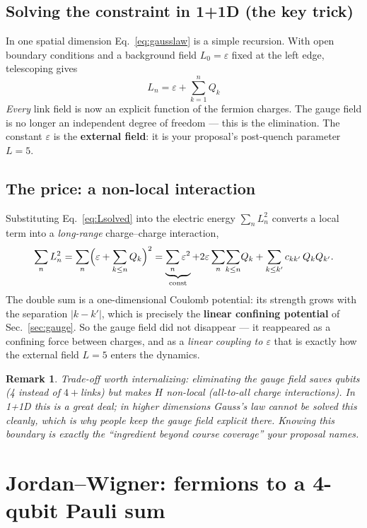 \documentclass[11pt,a4paper]{article}
\newtheorem{remark}{Remark}[section]
\begin{document}
\subsection{Solving the constraint in 1+1D (the key trick)}
In one spatial dimension Eq.~\eqref{eq:gausslaw} is a simple recursion. With open boundary
conditions and a background field $L_0=\varepsilon$ fixed at the left edge, telescoping gives
\begin{equation}
\boxed{\; L_n = \varepsilon + \sum_{k=1}^{n} Q_k \;}
\label{eq:Lsolved}
\end{equation}
\emph{Every} link field is now an explicit function of the fermion charges. The gauge field is no
longer an independent degree of freedom --- this is the elimination. The constant $\varepsilon$ is
the \textbf{external field}: it is your proposal's post-quench parameter $L=5$.

\subsection{The price: a non-local interaction}
Substituting Eq.~\eqref{eq:Lsolved} into the electric energy $\sum_n L_n^2$ converts a local term
into a \emph{long-range} charge--charge interaction,
\begin{equation}
\sum_n L_n^2 = \sum_n\Bigl(\varepsilon + \sum_{k\le n} Q_k\Bigr)^2
= \underbrace{\sum_n\varepsilon^2}_{\text{const}}
+ 2\varepsilon\sum_n\!\sum_{k\le n}\!Q_k
+ \sum_{k\le k'} c_{kk'}\,Q_k Q_{k'} .
\label{eq:nonlocal}
\end{equation}
The double sum is a one-dimensional Coulomb potential: its strength grows with the separation
$|k-k'|$, which is precisely the \textbf{linear confining potential} of Sec.~\ref{sec:gauge}. So the
gauge field did not disappear --- it reappeared as a confining force between charges, and as a
\emph{linear coupling to $\varepsilon$} that is exactly how the external field $L=5$ enters the
dynamics.

\begin{remark}
Trade-off worth internalizing: eliminating the gauge field saves qubits (4 instead of $4+$links) but
makes $H$ \emph{non-local} (all-to-all charge interactions). In 1+1D this is a great deal; in higher
dimensions Gauss's law cannot be solved this cleanly, which is why people keep the gauge field
explicit there. Knowing this boundary is exactly the ``ingredient beyond course coverage'' your
proposal names.
\end{remark}

\section{Jordan--Wigner: fermions to a 4-qubit Pauli sum}\label{sec:jw}
\end{document}
